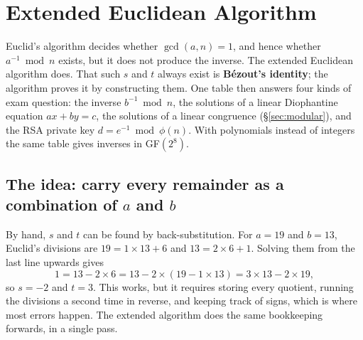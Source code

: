 \section{Extended Euclidean Algorithm \hothot}\label{sec:exteuclid}

Euclid's algorithm decides whether $\gcd(a, n) = 1$, and hence whether $a^{-1} \bmod n$ exists, but it does not produce the inverse. The extended Euclidean algorithm does.  That such $s$ and $t$ always exist is \textbf{Bézout's identity}; the algorithm proves it by constructing them. One table then answers four kinds of exam question: the inverse $b^{-1} \bmod n$, the solutions of a linear Diophantine equation $ax + by = c$, the solutions of a linear congruence (\S\ref{sec:modular}), and the RSA private key $d = e^{-1} \bmod \phi(n)$. With polynomials instead of integers the same table gives inverses in GF$(2^8)$.

\subsection{The idea: carry every remainder as a combination of \texorpdfstring{$a$ and $b$}{a and b}}
By hand, $s$ and $t$ can be found by back-substitution. For $a = 19$ and $b = 13$, Euclid's divisions are $19 = 1 \times 13 + 6$ and $13 = 2 \times 6 + 1$. Solving them from the last line upwards gives
\[
1 = 13 - 2 \times 6 = 13 - 2 \times (19 - 1 \times 13) = 3 \times 13 - 2 \times 19,
\]
so $s = -2$ and $t = 3$. This works, but it requires storing every quotient, running the divisions a second time in reverse, and keeping track of signs, which is where most errors happen. The extended algorithm does the same bookkeeping forwards, in a single pass.

